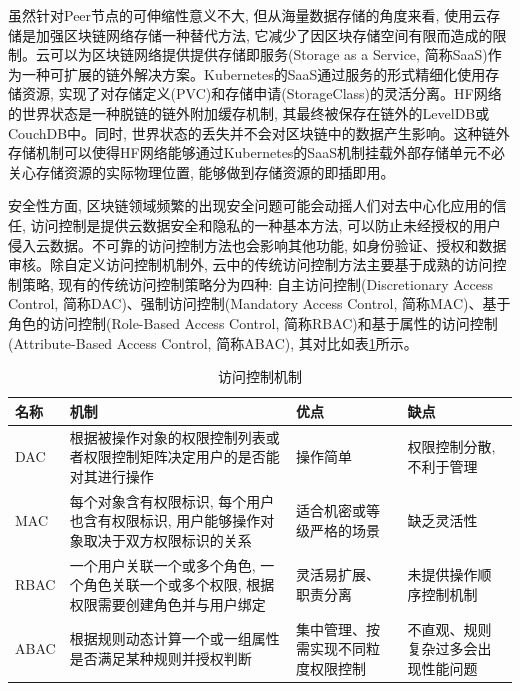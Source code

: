 虽然针对Peer节点的可伸缩性意义不大, 但从海量数据存储的角度来看, 使用云存储是加强区块链网络存储一种替代方法, 它减少了因区块存储空间有限而造成的限制\cite{gai2020blockchain}。云可以为区块链网络提供提供存储即服务(Storage as a Service, 简称SaaS)作为一种可扩展的链外解决方案。Kubernetes的SaaS通过服务的形式精细化使用存储资源, 实现了对存储定义(PVC)和存储申请(StorageClass)的灵活分离。HF网络的世界状态是一种脱链的链外附加缓存机制, 其最终被保存在链外的LevelDB或CouchDB中。同时, 世界状态的丢失并不会对区块链中的数据产生影响。这种链外存储机制可以使得HF网络能够通过Kubernetes的SaaS机制挂载外部存储单元不必关心存储资源的实际物理位置, 能够做到存储资源的即插即用。 

安全性方面, 区块链领域频繁的出现安全问题可能会动摇人们对去中心化应用的信任, 访问控制是提供云数据安全和隐私的一种基本方法, 可以防止未经授权的用户侵入云数据。不可靠的访问控制方法也会影响其他功能, 如身份验证、授权和数据审核。除自定义访问控制机制外, 云中的传统访问控制方法主要基于成熟的访问控制策略, 现有的传统访问控制策略分为四种: 自主访问控制(Discretionary Access Control, 简称DAC)、强制访问控制(Mandatory Access Control, 简称MAC)、基于角色的访问控制(Role-Based Access Control, 简称RBAC)和基于属性的访问控制(Attribute-Based Access Control, 简称ABAC), 其对比如表\ref{access_control}所示。

{\footnotesize
\begin{longtable}[h]{m{20pt} m{200pt} m{60pt} m{60pt}}
    \caption[访问控制机制]{访问控制机制} \label{access_control} \\
        \toprule  
        \textbf{名称}&\textbf{机制}&\textbf{优点}&\textbf{缺点}\\
        \hline
        DAC & 根据被操作对象的权限控制列表或者权限控制矩阵决定用户的是否能对其进行操作 & 操作简单 & 权限控制分散, 不利于管理 \\

        MAC & 每个对象含有权限标识, 每个用户也含有权限标识, 用户能够操作对象取决于双方权限标识的关系 & 适合机密或等级严格的场景 & 缺乏灵活性 \\

        RBAC & 一个用户关联一个或多个角色, 一个角色关联一个或多个权限, 根据权限需要创建角色并与用户绑定 & 灵活易扩展、职责分离 & 未提供操作顺序控制机制 \\

        ABAC & 根据规则动态计算一个或一组属性是否满足某种规则并授权判断 & 集中管理、按需实现不同粒度权限控制 & 不直观、规则复杂过多会出现性能问题 \\
        \bottomrule
    \end{longtable}
}

